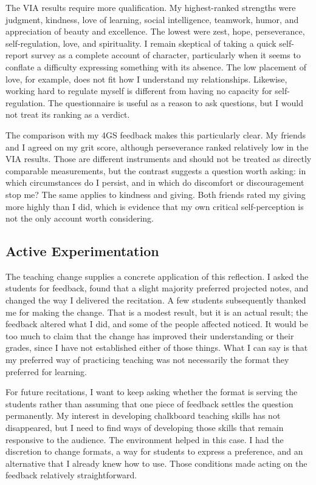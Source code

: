 \documentclass[12pt,stu,biblatex]{apa7}
\begin{document}
The VIA results require more qualification.
My highest-ranked strengths were judgment, kindness, love of learning, social intelligence, teamwork, humor, and appreciation of beauty and excellence.
The lowest were zest, hope, perseverance, self-regulation, love, and spirituality.
I remain skeptical of taking a quick self-report survey as a complete account of character, particularly when it seems to conflate a difficulty expressing something with its absence.
The low placement of love, for example, does not fit how I understand my relationships.
Likewise, working hard to regulate myself is different from having no capacity for self-regulation.
The questionnaire is useful as a reason to ask questions, but I would not treat its ranking as a verdict.

The comparison with my 4GS feedback makes this particularly clear.
My friends and I agreed on my grit score, although perseverance ranked relatively low in the VIA results.
Those are different instruments and should not be treated as directly comparable measurements, but the contrast suggests a question worth asking: in which circumstances do I persist, and in which do discomfort or discouragement stop me?
The same applies to kindness and giving.
Both friends rated my giving more highly than I did, which is evidence that my own critical self-perception is not the only account worth considering.

\subsection{Active Experimentation}
The teaching change supplies a concrete application of this reflection.
I asked the students for feedback, found that a slight majority preferred projected notes, and changed the way I delivered the recitation.
A few students subsequently thanked me for making the change.
That is a modest result, but it is an actual result; the feedback altered what I did, and some of the people affected noticed.
It would be too much to claim that the change has improved their understanding or their grades, since I have not established either of those things.
What I can say is that my preferred way of practicing teaching was not necessarily the format they preferred for learning.

For future recitations, I want to keep asking whether the format is serving the students rather than assuming that one piece of feedback settles the question permanently.
My interest in developing chalkboard teaching skills has not disappeared, but I need to find ways of developing those skills that remain responsive to the audience.
The environment helped in this case.
I had the discretion to change formats, a way for students to express a preference, and an alternative that I already knew how to use.
Those conditions made acting on the feedback relatively straightforward.
\end{document}
